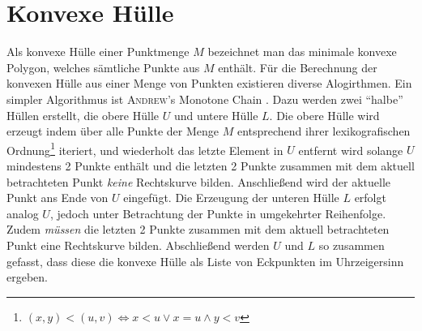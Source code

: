 \section{Konvexe Hülle}
\writtenby{\dcauthornameewie}%
Als konvexe Hülle einer Punktmenge $M$ bezeichnet man das minimale konvexe Polygon, welches sämtliche Punkte aus $M$ enthält.
Für die Berechnung der konvexen Hülle aus einer Menge von Punkten existieren diverse Alogirthmen.
Ein simpler Algorithmus ist \textsc{Andrew}'s Monotone Chain  \cite[6--7]{compgeom2008}.
Dazu werden zwei "`halbe"' Hüllen erstellt, die obere Hülle $U$ und untere Hülle $L$.
Die obere Hülle wird erzeugt indem über alle Punkte der Menge $M$ entsprechend ihrer lexikografischen Ordnung\footnote{
  \( (x,y) < (u, v) \Longleftrightarrow x < u \vee x = u \wedge y < v \)
} iteriert, und wiederholt das letzte Element in $U$ entfernt wird solange $U$ mindestens 2 Punkte enthält und die letzten 2 Punkte zusammen mit dem aktuell betrachteten Punkt \emph{keine} Rechtskurve bilden.
Anschließend wird der aktuelle Punkt ans Ende von $U$ eingefügt.
Die Erzeugung der unteren Hülle $L$ erfolgt analog $U$, jedoch unter Betrachtung der Punkte in umgekehrter Reihenfolge.
Zudem \emph{müssen} die letzten 2 Punkte zusammen mit dem aktuell betrachteten Punkt eine Rechtskurve bilden.
Abschließend werden $U$ und $L$ so zusammen gefasst, dass diese die konvexe Hülle als Liste von Eckpunkten im Uhrzeigersinn ergeben.

